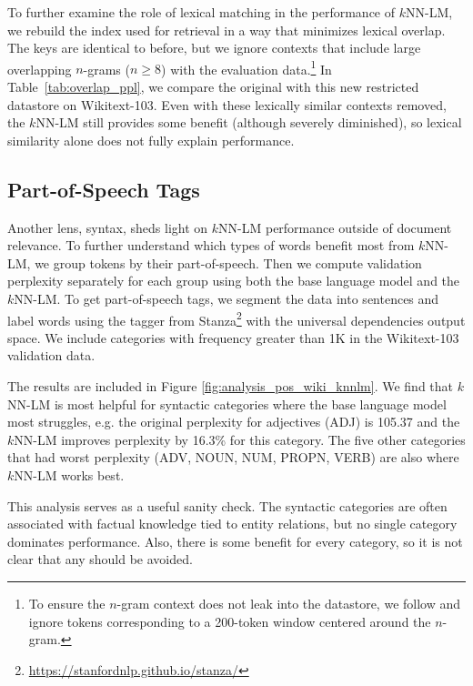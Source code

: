 \documentclass[11pt]{article}
\begin{document}
To further examine the role of lexical matching in the performance of $k$NN-LM, we rebuild the index used for retrieval in a way that minimizes lexical overlap. The keys are identical to before, but we ignore contexts that include large overlapping $n$-grams ($n \geq 8$) with the evaluation data.\footnote{To ensure the $n$-gram context does not leak into the datastore, we follow \citet{gpt} and ignore tokens corresponding to a 200-token window centered around the $n$-gram.} In Table~\ref{tab:overlap_ppl}, we compare the original with this new restricted datastore on Wikitext-103. Even with these lexically similar contexts removed, the $k$NN-LM still provides some benefit (although severely diminished), so lexical similarity alone does not fully explain performance.


\subsection{Part-of-Speech Tags}

\label{sec:syntactic_analysis}

Another lens, syntax, sheds light on $k$NN-LM performance outside of document relevance.  To further understand which types of words benefit most from $k$NN-LM,  we group tokens by their part-of-speech. Then we compute validation perplexity separately for each group using both the base language model and the $k$NN-LM. To get part-of-speech tags, we segment the data into sentences and label words using the tagger from Stanza\footnote{\href{https://stanfordnlp.github.io/stanza/}{https://stanfordnlp.github.io/stanza/}} with the universal dependencies output space. We include categories with frequency greater than 1K in the Wikitext-103 validation data.

The results are included in Figure \ref{fig:analysis_pos_wiki_knnlm}. We find that $k$NN-LM is most helpful for syntactic categories where the base language model most struggles, e.g. the original perplexity for adjectives (ADJ) is 105.37 and the $k$NN-LM improves perplexity by 16.3\% for this category. The five other categories that had worst perplexity (ADV, NOUN, NUM, PROPN, VERB) are also where $k$NN-LM works best.

This analysis serves as a useful sanity check. The syntactic categories are often associated with factual knowledge tied to entity relations, but no single category dominates performance. Also, there is some benefit for every category, so it is not clear that any should be avoided.
\end{document}
